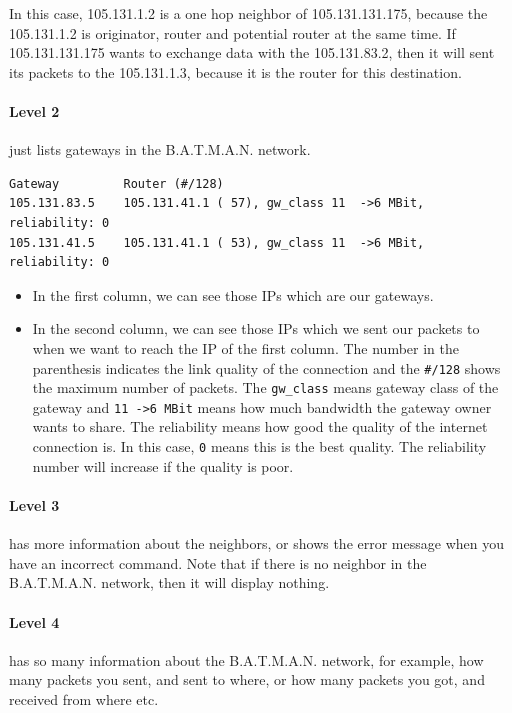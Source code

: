 \documentclass[
	12pt,
	a4paper,
	twoside,
	english,
	headsepline,
	footnosepline,
	automark,
	normalheadings,
	openany,
	cleardoubleplain,
	abstracton,
	idxtotoc,
	liststotoc,
	bibtotoc,
 	BCOR8mm,
]{scrartcl}
\begin{document}
In this case, 105.131.1.2 is a one hop neighbor of 105.131.131.175, because the
105.131.1.2 is originator, router and potential router at the same time. If
105.131.131.175 wants to exchange data with the 105.131.83.2, then it will sent
its packets to the 105.131.1.3, because it is the router for this destination.

\paragraph*{Level 2}
just lists gateways in the B.A.T.M.A.N. network.

\begin{lstlisting}[basicstyle=\footnotesize,	frame=single, columns= flexible]
Gateway         Router (#/128)
105.131.83.5    105.131.41.1 ( 57), gw_class 11  ->6 MBit, reliability: 0
105.131.41.5    105.131.41.1 ( 53), gw_class 11  ->6 MBit, reliability: 0
\end{lstlisting}

\begin{itemize}
\item In the first column, we can see those IPs which are our gateways.
\item In the second column, we can see those IPs which we sent our packets to
      when we want to reach the IP of the first column. The number in the
      parenthesis indicates the link quality of the connection and the
      \verb|#/128| shows the maximum number of packets. The \verb|gw_class|
      means gateway class of the gateway and \verb|11 ->6 MBit| means how much
      bandwidth the gateway owner wants to share. The reliability means how good
      the quality of the internet connection is. In this case, \verb|0| means
      this is the best quality. The reliability number will increase if the
      quality is poor.
\end{itemize}

\paragraph*{Level 3}
has more information about the neighbors, or shows the error message when you
have an incorrect command. Note that if there is no neighbor in the B.A.T.M.A.N.
network, then it will display nothing.

\paragraph*{Level 4}
has so many information about the B.A.T.M.A.N. network, for example, how many
packets you sent, and sent to where, or how many packets you got, and received
from where etc.
\end{document}
